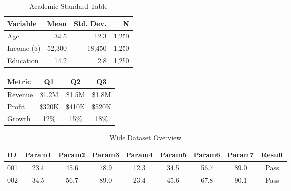 

\begin{table}[H]
\centering
\caption{Academic Standard Table}
\label{tab:academic}
\begin{tabular}{lrrr}
\toprule
\textbf{Variable} & \textbf{Mean} & \textbf{Std. Dev.} & \textbf{N} \\
\midrule
Age & 34.5 & 12.3 & 1,250 \\
Income (\$) & 52,300 & 18,450 & 1,250 \\
Education & 14.2 & 2.8 & 1,250 \\
\bottomrule
\end{tabular}
\end{table}

\usepackage{colortbl}

\begin{table}[H]
\centering
\renewcommand{\arraystretch}{1.3}
\begin{tabular}{|l|c|c|c|}
\hline
\rowcolor{headergrad}
\color{white}\textbf{Metric} & \color{white}\textbf{Q1} & \color{white}\textbf{Q2} & \color{white}\textbf{Q3} \\
\hline
\rowcolor{rowalt}
Revenue & \$1.2M & \$1.5M & \$1.8M \\
Profit & \$320K & \$410K & \$520K \\
\rowcolor{rowalt}
Growth & 12\% & 15\% & 18\% \\
\hline
\end{tabular}
\end{table}

\usepackage{rotating}
\begin{table}
\centering
\caption{Wide Dataset Overview}
\begin{tabular}{lcccccccc}
\toprule
ID & Param1 & Param2 & Param3 & Param4 & Param5 & Param6 & Param7 & Result \\
\midrule
001 & 23.4 & 45.6 & 78.9 & 12.3 & 34.5 & 56.7 & 89.0 & Pass \\
002 & 34.5 & 56.7 & 89.0 & 23.4 & 45.6 & 67.8 & 90.1 & Pass \\
\bottomrule
\end{tabular}
\end{table}

